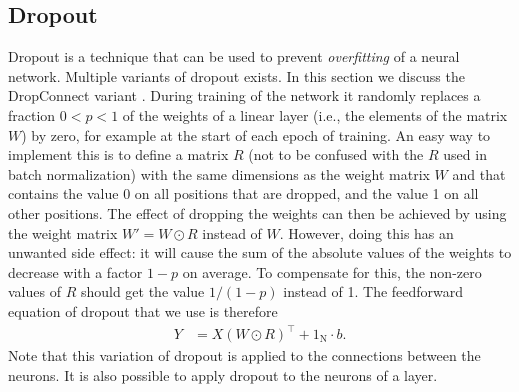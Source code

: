\documentclass[twoside,11pt]{article}
\newcommand{\const}[1]{\ensuremath{\mathrm{#1}}} %
\begin{document}
\subsection{Dropout}

Dropout \citep{DBLP:journals/jmlr/SrivastavaHKSS14} is a technique that can be used to prevent \emph{overfitting} of a neural network. Multiple variants of dropout exists. In this section we discuss the DropConnect variant \citep{DBLP:conf/icml/WanZZLF13}. During training of the network it randomly replaces a fraction $0 < p < 1$ of the weights of a linear layer (i.e., the elements of the matrix $W$) by zero, for example at the start of each epoch of training. An easy way to implement this is to define a matrix $R$
(not to be confused with the $R$ used in batch normalization)
with the same dimensions as the weight matrix $W$ and that contains the value 0 on all positions that are dropped, and the value 1 on all other positions. The effect of dropping the weights can then be achieved by using the weight matrix $W' = W \odot R$ instead of $W$. 
However, doing this has an unwanted side effect: it will cause the sum of the absolute values of the weights to decrease with a factor $1 - p$ on average. To compensate for this, the non-zero values of $R$ should get the value $1 / (1 - p)$ instead of 1.
The feedforward equation of dropout that we use is therefore
\begin{align}
Y &= X (W \odot R)^\top + 1_\const{N} \cdot b.
\end{align}
Note that this variation of dropout is applied to the connections between the neurons. It is also possible to apply dropout to the neurons of a layer.
\end{document}
